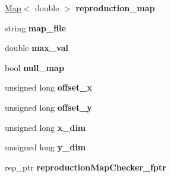\begin{DoxyCompactItemize}
\item 
\hyperlink{class_map}{Map}$<$ double $>$ {\bfseries reproduction\+\_\+map}\hypertarget{class_reproduction_map_a3681ef51e0b41832c9a1f93b7f7e1137}{}\label{class_reproduction_map_a3681ef51e0b41832c9a1f93b7f7e1137}

\item 
string {\bfseries map\+\_\+file}\hypertarget{class_reproduction_map_a4fdefab63d92f1244422b602ef11b2ee}{}\label{class_reproduction_map_a4fdefab63d92f1244422b602ef11b2ee}

\item 
double {\bfseries max\+\_\+val}\hypertarget{class_reproduction_map_a093ebaad740e4d8b0873bb6e96e5e1c1}{}\label{class_reproduction_map_a093ebaad740e4d8b0873bb6e96e5e1c1}

\item 
bool {\bfseries null\+\_\+map}\hypertarget{class_reproduction_map_a3ae593187d7087cb543f40fe59218257}{}\label{class_reproduction_map_a3ae593187d7087cb543f40fe59218257}

\item 
unsigned long {\bfseries offset\+\_\+x}\hypertarget{class_reproduction_map_acaa2a99d3667440a1e610fd1d0ecda7e}{}\label{class_reproduction_map_acaa2a99d3667440a1e610fd1d0ecda7e}

\item 
unsigned long {\bfseries offset\+\_\+y}\hypertarget{class_reproduction_map_ae70ca7adb1272ed2a15287108526351b}{}\label{class_reproduction_map_ae70ca7adb1272ed2a15287108526351b}

\item 
unsigned long {\bfseries x\+\_\+dim}\hypertarget{class_reproduction_map_aea934c598f314851c50a9d5aa12f8035}{}\label{class_reproduction_map_aea934c598f314851c50a9d5aa12f8035}

\item 
unsigned long {\bfseries y\+\_\+dim}\hypertarget{class_reproduction_map_a48dcb8efff54b3734d2a560f6660dc18}{}\label{class_reproduction_map_a48dcb8efff54b3734d2a560f6660dc18}

\item 
rep\+\_\+ptr {\bfseries reproduction\+Map\+Checker\+\_\+fptr}\hypertarget{class_reproduction_map_a927b35c48a2c3c32a994a95ebfb9aa87}{}\label{class_reproduction_map_a927b35c48a2c3c32a994a95ebfb9aa87}

\end{DoxyCompactItemize}
